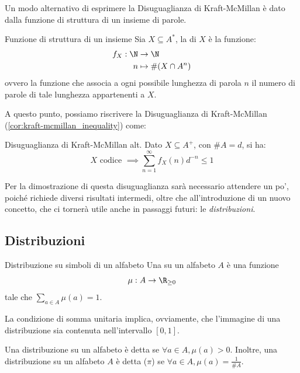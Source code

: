 Un modo alternativo di esprimere la Disuguaglianza di Kraft-McMillan è dato dalla funzione di struttura di un insieme di parole.
\begin{definition}[namedlabel={def:structure_function}{Funzione di struttura di un insieme}]{Funzione di struttura di un insieme}
  Sia \(X \subseteq A^*\), la  di \(X\) è la funzione:
  \begin{equation*}
    \begin{aligned}
      f_X: \N &\to \N \\
      n &\mapsto \#(X \cap A^n)
    \end{aligned}
  \end{equation*}
  ovvero la funzione che associa a ogni possibile lunghezza di parola \(n\) il numero di parole di tale lunghezza appartenenti a \(X\).
\end{definition}

A questo punto, possiamo riscrivere la Disuguaglianza di Kraft-McMillan (\ref{cor:kraft-mcmillan_inequality}) come:
\begin{corollary}[namedlabel={cor:kraft-mcmillan_inequality_alt}{Disuguaglianza di Kraft-McMillan alt.}]{Disuguaglianza di Kraft-McMillan alt.}
  Dato \(X \subseteq A^+\), con \(\# A = d\), si ha:
    \[X \text{ codice } \implies \sum_{n=1}^{\infty} f_X(n) d^{-n} \leq 1\]
\end{corollary}

Per la dimostrazione di questa disuguaglianza sarà necessario attendere un po', poiché richiede diversi risultati intermedi, oltre che all'introduzione di un nuovo concetto, che ci tornerà utile anche in passaggi futuri: le \emph{distribuzioni}.
\subsection{Distribuzioni}

\begin{definition}{Distribuzione su simboli di un alfabeto}
  Una  su un alfabeto \(A\) è una funzione
    \[\mu: A \to \R_{\geq 0}\]
  tale che \(\sum_{a \in A} \mu(a) = 1\).
\end{definition}
La condizione di somma unitaria implica, ovviamente, che l'immagine di una distribuzione sia contenuta nell'intervallo \([0,1]\).

Una distribuzione su un alfabeto è detta  se \(\forall a \in A, \mu(a) > 0\).
Inoltre, una distribuzione su un alfabeto \(A\) è detta  (\(\pi\)) se \(\forall a \in A, \mu(a) = \frac{1}{\# A}\).

